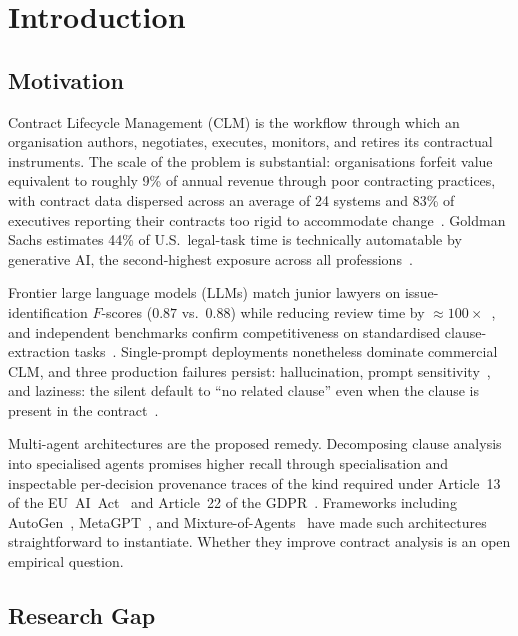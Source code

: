 
\chapter{Introduction}\label{chapter:introduction}

\section{Motivation}\label{sec:motivation}

Contract Lifecycle Management (CLM) is the workflow through which an organisation authors,
negotiates, executes, monitors, and retires its contractual instruments. The scale of the problem is substantial: organisations forfeit value equivalent to roughly
9\% of annual revenue through poor contracting practices, with contract data dispersed
across an average of 24 systems and 83\% of executives reporting their contracts too rigid
to accommodate change~\cite{worldcc2025benchmark}. Goldman Sachs estimates 44\% of
U.S.\ legal-task time is technically automatable by generative AI, the second-highest
exposure across all professions~\cite{goldmansachs2023ai}.

Frontier large language models (LLMs) match junior lawyers on issue-identification
$F$-scores ($0.87$ vs.\ $0.88$) while reducing review time by
$\approx\!100\times$~\cite{martin2024bettercallgpt}, and independent benchmarks confirm
competitiveness on standardised clause-extraction
tasks~\cite{hendrycks2021cuad,liu2025contracteval}. Single-prompt deployments nonetheless
dominate commercial CLM, and three production failures persist: hallucination, prompt
sensitivity~\cite{chatterjee2024posix}, and laziness: the silent default to
``no related clause'' even when the clause is present in the
contract~\cite{liu2025contracteval}.

Multi-agent architectures are the proposed remedy. Decomposing clause analysis into
specialised agents promises higher recall through specialisation and inspectable
per-decision provenance traces of the kind required under Article~13 of the
EU~AI~Act~\cite{euaiact2024} and Article~22 of the GDPR~\cite{gdpr2016}.
Frameworks including AutoGen~\cite{wu2023autogen},
MetaGPT~\cite{hong2024metagpt}, and Mixture-of-Agents~\cite{wang2024moa} have made such
architectures straightforward to instantiate. Whether they improve contract analysis
is an open empirical question.

\section{Research Gap}\label{sec:gap}

